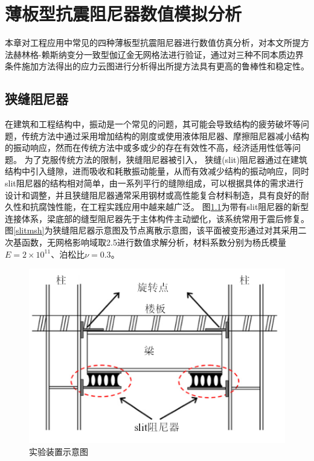 \chapter{薄板型抗震阻尼器数值模拟分析}
本章对工程应用中常见的四种薄板型抗震阻尼器进行数值仿真分析，对本文所提方法赫林格-赖斯纳变分一致型伽辽金无网格法进行验证，通过对三种不同本质边界条件施加方法得出的应力云图进行分析得出所提方法具有更高的鲁棒性和稳定性。
\section{狭缝阻尼器}
在建筑和工程结构中，振动是一个常见的问题，其可能会导致结构的疲劳破坏等问题，传统方法中通过采用增加结构的刚度或使用液体阻尼器、摩擦阻尼器减小结构的振动响应，然而在传统方法中或多或少的存在有效性不高，经济适用性低等问题。
为了克服传统方法的限制，狭缝阻尼器被引入，
狭缝(slit)阻尼器通过在建筑结构中引入缝隙，进而吸收和耗散振动能量，从而有效减少结构的振动响应，同时slit阻尼器的结构相对简单，由一系列平行的缝隙组成，可以根据具体的需求进行设计和调整，并且狭缝阻尼器通常采用钢材或高性能复合材料制造，具有良好的耐久性和抗腐蚀性能，在工程实践应用中越来越广泛。
图\ref{slit1}为带有slit阻尼器的新型连接体系，梁底部的缝型阻尼器先于主体构件主动塑化，该系统常用于震后修复。
图\ref{slitmsh}为狭缝阻尼器示意图及节点离散示意图，该平面被变形通过对其采用二次基函数，无网格影响域取2.5进行数值求解分析，材料系数分别为杨氏模量$E=2\times 10^{11}$、泊松比$\nu=0.3$。
\begin{figure}[H]
    \centering
    \includegraphics[scale=0.7]{figure/DAMPER/SLIT/1.png}
    \caption{实验装置示意图\cite{oh2009}}\label{slit1}
\end{figure}
